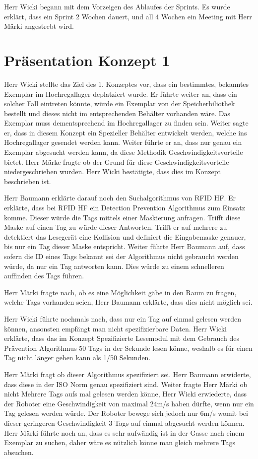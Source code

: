 \documentclass[parskip=full, a4paper]{scrreprt}
\begin{document}
Herr Wicki begann mit dem Vorzeigen des Ablaufes der Sprints.  
Es wurde erklärt, dass ein Sprint 2 Wochen dauert, und all 4 Wochen ein Meeting mit Herr Märki angestrebt wird. 

\chapter{Präsentation Konzept 1}

Herr Wicki stellte das Ziel des 1. Konzeptes vor, dass ein bestimmtes, bekanntes Exemplar im Hochregallager deplatziert wurde. Er führte weiter an, dass ein solcher Fall eintreten könnte, würde ein Exemplar von der Speicherbiliothek bestellt und dieses nicht im entsprechenden Behälter vorhanden wäre. Das Exemplar muss dementsprechend im Hochregallager zu finden sein. 
Weiter sagte er, dass in diesem Konzept ein Spezieller Behälter entwickelt werden, welche ins Hochregallager gesendet werden kann. Weiter führte er an, dass nur genau ein Exemplar abgesucht werden kann, da diese Methodik Geschwindigkeitsvorteile bietet. Herr Märke fragte ob der Grund für diese Geschwindigkeitsvorteile niedergeschrieben wurden. Herr Wicki bestätigte, dass dies im Konzept beschrieben ist.  

Herr Baumann erklärte darauf noch den Suchalgorithmus von RFID HF. Er erklärte, dass bei RFID HF ein Detection Prevention Algorithmus zum Einsatz komme. Dieser würde die Tags mittels einer Maskierung anfragen. Trifft diese Maske auf einen Tag zu würde dieser Antworten. Trifft er auf mehrere zu detektiert das Lesegerät eine Kollision und definiert die Eingabemaske genauer, bis nur ein Tag dieser Maske entspricht. Weiter führte Herr Baumann auf, dass sofern die ID eines Tags bekannt sei der Algorithmus nicht gebraucht werden würde, da nur ein Tag antworten kann. Dies würde zu einem schnelleren auffinden des Tags führen. 

Herr Märki fragte nach, ob es eine Möglichkeit gäbe in den Raum zu fragen, welche Tags vorhanden seien, Herr Baumann erklärte, dass dies nicht möglich sei. 

Herr Wicki führte nochmals nach, dass nur ein Tag auf einmal gelesen werden können, ansonsten empfängt man nicht spezifizierbare Daten. 
Herr Wicki erklärte, dass das im Konzept Spezifizierte Lesemodul mit dem Gebrauch des Prävention Algorithmus 50 Tags in der Sekunde lesen könne, weshalb es für einen Tag nicht länger gehen kann als 1/50 Sekunden. 

Herr Märki fragt ob dieser Algorithmus spezifiziert sei. Herr Baumann erwiderte, dass diese in der ISO Norm genau spezifiziert sind. 
Weiter fragte Herr Märki ob nicht Mehrere Tags aufs mal gelesen werden könne, Herr Wicki erwiederte, dass der Roboter eine Geschwindigkeit von maximal 24m/s haben dürfte, wenn nur ein Tag gelesen werden würde. Der Roboter bewege sich jedoch nur 6m/s womit bei dieser geringeren Geschwindigkeit 3 Tags auf einmal abgesucht werden können. 
Herr Märki führte noch an, dass es sehr aufwändig ist in der Gasse nach einem Exemplar zu suchen, daher wäre es nützlich könne man gleich mehrere Tags absuchen. 
\end{document}
